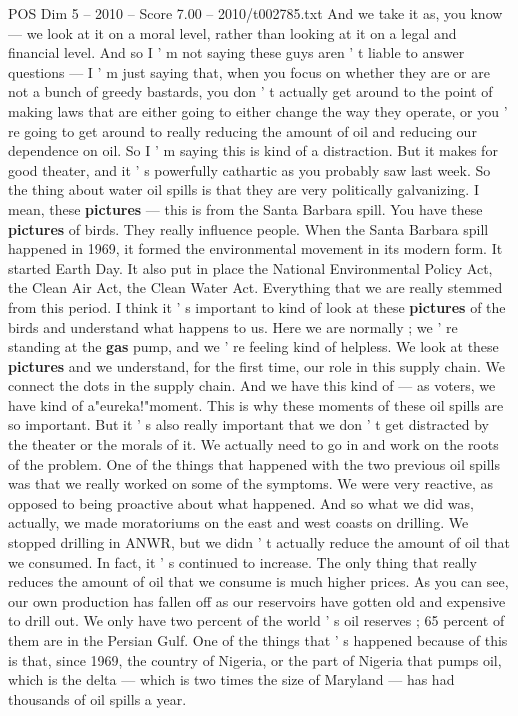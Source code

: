 \begin{textsample}{POS Dim 5 – 2010 – Score 7.00 – 2010/t002785.txt}
And we take it as, you know — we look at it on a moral level, rather than looking at it on a legal and financial level.
And so I ' m not saying these guys aren ' t liable to answer questions — I ' m just saying that, when you focus on whether they are or are not a bunch of greedy bastards, you don ' t actually get around to the point of making laws that are either going to either change the way they operate, or you ' re going to get around to really reducing the amount of oil and reducing our dependence on oil.
So I ' m saying this is kind of a distraction.
But it makes for good theater, and it ' s powerfully cathartic as you probably saw last week.
So the thing about water oil spills is that they are very politically galvanizing.
I mean, these \textbf{pictures} — this is from the Santa Barbara spill.
You have these \textbf{pictures} of birds.
They really influence people.
When the Santa Barbara spill happened in 1969, it formed the environmental movement in its modern form.
It started Earth Day.
It also put in place the National Environmental Policy Act, the Clean Air Act, the Clean Water Act.
Everything that we are really stemmed from this period.
I think it ' s important to kind of look at these \textbf{pictures} of the birds and understand what happens to us.
Here we are normally ; we ' re standing at the \textbf{gas} pump, and we ' re feeling kind of helpless.
We look at these \textbf{pictures} and we understand, for the first time, our role in this supply chain.
We connect the dots in the supply chain.
And we have this kind of — as voters, we have kind of a"eureka!"moment.
This is why these moments of these oil spills are so important.
But it ' s also really important that we don ' t get distracted by the theater or the morals of it.
We actually need to go in and work on the roots of the problem.
One of the things that happened with the two previous oil spills was that we really worked on some of the symptoms.
We were very reactive, as opposed to being proactive about what happened.
And so what we did was, actually, we made moratoriums on the east and west coasts on drilling.
We stopped drilling in ANWR, but we didn ' t actually reduce the amount of oil that we consumed.
In fact, it ' s continued to increase.
The only thing that really reduces the amount of oil that we consume is much higher prices.
As you can see, our own production has fallen off as our reservoirs have gotten old and expensive to drill out.
We only have two percent of the world ' s oil reserves ; 65 percent of them are in the Persian Gulf.
One of the things that ' s happened because of this is that, since 1969, the country of Nigeria, or the part of Nigeria that pumps oil, which is the delta — which is two times the size of Maryland — has had thousands of oil spills a year.

\end{textsample}
